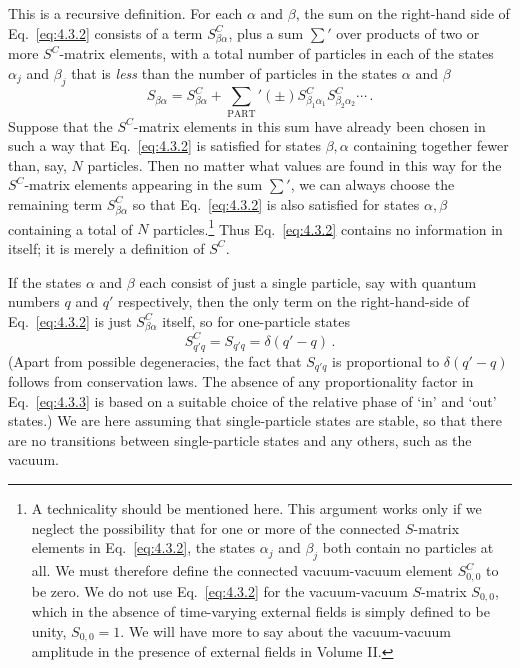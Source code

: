 This is a recursive definition. For each $\alpha$ and $\beta$, the sum on the
right-hand side of Eq.~\eqref{eq:4.3.2} consists of a term $S^C_{\beta\alpha}$, plus a
sum $\sum'$ over products of two or more $S^C$-matrix elements, with a total
number of particles in each of the states $\alpha_j$ and $\beta_j$ that is
\emph{less} than the number of particles in the states $\alpha$ and $\beta$
\[
S_{\beta\alpha}=S^C_{\beta\alpha}
+\sum_{\mathrm{PART}}'(\pm)
 S^C_{\beta_1\alpha_1}S^C_{\beta_2\alpha_2}\cdots\,.
\]
Suppose that the $S^C$-matrix elements in this sum have already been chosen
in such a way that Eq.~\eqref{eq:4.3.2} is satisfied for states $\beta,\alpha$ containing
together fewer than, say, $N$ particles. Then no matter what values are found
in this way for the $S^C$-matrix elements appearing in the sum $\sum'$, we can
always choose the remaining term $S^C_{\beta\alpha}$ so that Eq.~\eqref{eq:4.3.2} is
also satisfied for states $\alpha,\beta$ containing a total of $N$
particles.\footnote{A technicality should be mentioned here. This argument
works only if we neglect the possibility that for one or more of the connected
$S$-matrix elements in Eq.~\eqref{eq:4.3.2}, the states $\alpha_j$ and $\beta_j$ both
contain no particles at all. We must therefore define the connected
vacuum-vacuum element $S^C_{0,0}$ to be zero. We do not use Eq.~\eqref{eq:4.3.2} for
the vacuum-vacuum $S$-matrix $S_{0,0}$, which in the absence of time-varying
external fields is simply defined to be unity, $S_{0,0}=1$. We will have more
to say about the vacuum-vacuum amplitude in the presence of external fields in
Volume II.} Thus Eq.~\eqref{eq:4.3.2} contains no information in itself; it is merely a
definition of $S^C$.

If the states $\alpha$ and $\beta$ each consist of just a single particle, say
with quantum numbers $q$ and $q'$ respectively, then the only term on the
right-hand-side of Eq.~\eqref{eq:4.3.2} is just $S^C_{\beta\alpha}$ itself, so for
one-particle states
\begin{equation}
S^C_{q'q}=S_{q'q}=\delta(q'-q)\,.
\tag{4.3.3}
\label{eq:4.3.3}
\end{equation}
(Apart from possible degeneracies, the fact that $S_{q'q}$ is proportional to
$\delta(q'-q)$ follows from conservation laws. The absence of any
proportionality factor in Eq.~\eqref{eq:4.3.3} is based on a suitable choice of the
relative phase of `in' and `out' states.) We are here assuming that
single-particle states are stable, so that there are no transitions between
single-particle states and any others, such as the vacuum.

